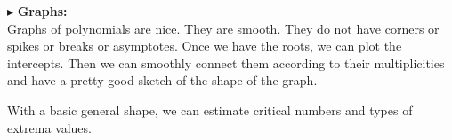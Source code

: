 \documentclass{ximera}
\begin{document}
$\blacktriangleright$ \textbf{\textcolor{red!10!blue!90!}{Graphs:}} \\ 
Graphs of polynomials are nice.  They are smooth.  They do not have corners or spikes or breaks or asymptotes. Once we have the roots, we can plot the intercepts.  Then we can smoothly connect them according to their multiplicities and have a pretty good sketch of the shape of the graph.

With a basic general shape, we can estimate critical numbers and types of extrema values.
\end{document}
